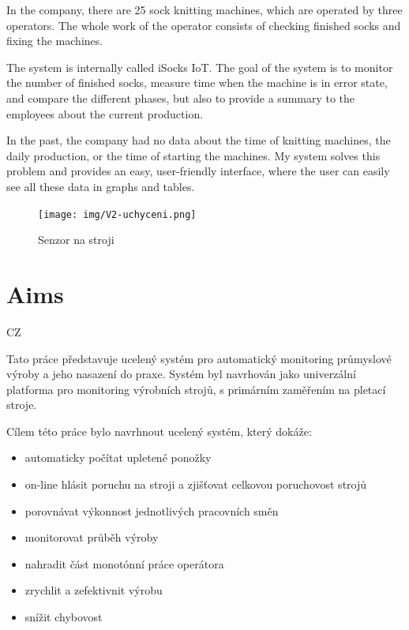 \documentclass[12pt, a4paper]{article}
\begin{document}
In the company, there are 25 sock knitting machines, which are operated by three operators.
The whole work of the operator consists of checking finished socks and fixing the machines.

The system is internally called iSocks IoT.
The goal of the system is to monitor the number of finished socks, measure time when the machine is in error state, and compare the different phases, but also to provide a summary to the employees about the current production.

In the past, the company had no data about the time of knitting machines, the daily production, or the time of starting the machines.
My system solves this problem and provides an easy, user-friendly interface, where the user can easily see all these data in graphs and tables.

\newpage

\begin{figure}[t]
    \centering
    \texttt{[image: img/V2-uchyceni.png]}
    \caption{Senzor na stroji}
    \label{fig:SenzorNaStroji}
\end{figure}


\section*{Aims}
CZ

Tato práce představuje ucelený systém pro automatický monitoring průmyslové výroby a jeho nasazení do praxe.
Systém byl navrhován jako univerzální platforma pro monitoring výrobních strojů, s primárním zaměřením na pletací stroje.

Cílem této práce bylo navrhnout ucelený systém, který dokáže:

\begin{itemize}
    \item automaticky počítat upletené ponožky
    \item on-line hlásit poruchu na stroji a zjišťovat celkovou poruchovost strojů
    \item porovnávat výkonnost jednotlivých pracovních směn
    \item monitorovat průběh výroby
    \item nahradit část monotónní práce operátora
    \item zrychlit a zefektivnit výrobu
    \item snížit chybovost
\end{itemize}
\end{document}
